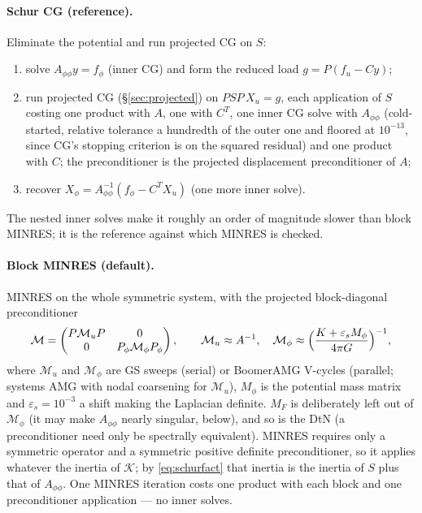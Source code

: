 \documentclass[11pt]{article}
\numberwithin{equation}{section}
\theoremstyle{remark}
\newcommand{\eps}{\varepsilon}
\begin{document}
\paragraph{Schur CG (reference).} Eliminate the potential and run projected
CG on $S$:
\begin{enumerate}
\item solve $A_{\phi\phi}y = f_\phi$ (inner CG) and form the reduced load
  $g = P(f_u - Cy)$;
\item run projected CG (\S\ref{sec:projected}) on $PSP\,X_u = g$, each
  application of $S$ costing one product with $A$, one with $C^T$, one inner
  CG solve with $A_{\phi\phi}$ (cold-started, relative tolerance a hundredth
  of the outer one and floored at $10^{-13}$, since CG's stopping criterion
  is on the squared residual) and one product with $C$; the preconditioner
  is the projected displacement preconditioner of $A$;
\item recover $X_\phi = A_{\phi\phi}^{-1}(f_\phi - C^TX_u)$ (one more inner
  solve).
\end{enumerate}
The nested inner solves make it roughly an order of magnitude slower than
block MINRES; it is the reference
against which MINRES is checked.

\paragraph{Block MINRES (default).} MINRES on the whole symmetric system,
with the projected block-diagonal preconditioner
\begin{equation}
  \mathcal{M} = \begin{pmatrix} P\mathcal{M}_uP & 0\\ 0 &
     P_\phi\mathcal{M}_\phi P_\phi\end{pmatrix}, \qquad
  \mathcal{M}_u\approx A^{-1}, \quad
  \mathcal{M}_\phi\approx\Bigl(\frac{K + \eps_sM_\phi}{4\pi G}\Bigr)^{-1},
\end{equation}
where $\mathcal{M}_u$ and $\mathcal{M}_\phi$ are GS sweeps (serial) or
BoomerAMG V-cycles (parallel; systems AMG with nodal coarsening for $\mathcal{M}_u$),
$M_\phi$ is the potential mass matrix and $\eps_s = 10^{-3}$ a shift making
the Laplacian definite. $M_F$ is deliberately left out of
$\mathcal{M}_\phi$ (it may make $A_{\phi\phi}$ nearly singular, below),
and so is the DtN (a preconditioner need only be spectrally equivalent).
MINRES requires only a symmetric operator and a symmetric positive
definite preconditioner, so it applies whatever the inertia of
$\mathcal{K}$; by \eqref{eq:schurfact} that inertia is the inertia of $S$
plus that of $A_{\phi\phi}$. One MINRES iteration costs one product with
each block and one preconditioner application --- no inner solves.
\end{document}
